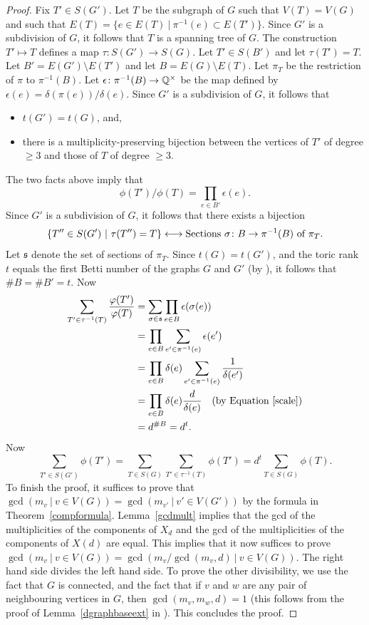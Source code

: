 \begin{proof}
 Fix $T' \in S(G')$. Let $T$ be the subgraph of $G$ such that $V(T) = V(G)$ and such that $E(T) = \{ e \in E(T) \ | \ \pi^{-1}(e) \subset E(T') \}$. Since $G'$ is a subdivision of $G$, it follows that $T$ is a spanning tree of $G$. The construction $T' \mapsto T$ defines a map $\tau \colon S(G') \rightarrow S(G)$. Let $T' \in S(B')$ and let $\tau(T') = T$. Let $B' = E(G') \setminus E(T')$ and let  $B = E(G) \setminus E(T)$. Let $\pi_T$ be the restriction of $\pi$ to $\pi^{-1}(B)$. Let $\epsilon \colon \pi^{-1}(B) \rightarrow \Q^\times$ be the map defined by $\epsilon(e) = \delta(\pi(e))/\delta(e)$. Since $G'$ is a subdivision of $G$, it follows that
 \begin{itemize}
  \item $t(G') = t(G)$, and,
  \item there is a multiplicity-preserving bijection between the vertices of $T'$ of degree $\geq 3$ and those of $T$ of degree $\geq 3$.
 \end{itemize}
The two facts above imply that 
\[ \phi(T')/\phi(T) = \prod_{e \in B'} \epsilon(e) .\]
Since $G'$ is a subdivision of $G$, it follows that there exists a bijection
\[ \{ T'' \in S(G') \ | \ \tau(T'') = T \} \longleftrightarrow \textup{Sections } \sigma \colon B \rightarrow \pi^{-1}(B) \textup{ of } \pi_T .\]
Let $\mathfrak{s}$ denote the set of sections of $\pi_T$. Since $t(G) = t(G')$, and the toric rank $t$ equals the first Betti number of the graphs $G$ and $G'$ (by \cite[9.2.5,9.2.8]{blr}), it follows that $\# B = \# B' = t$. Now
\begin{align*} \sum_{T' \in \tau^{-1}(T)} \frac{\phi(T')}{\phi(T)} &= \sum_{\sigma \in \mathfrak{s}} \prod_{e \in B} \epsilon (\sigma(e)) \\
&= \prod_{e \in B} \sum_{e' \in \pi^{-1}(e)} \epsilon(e') \\
&= \prod_{e \in B} \delta(e) \sum_{e' \in \pi^{-1}(e)} \frac{1}{\delta(e')} \\
&= \prod_{e \in B} \delta(e) \frac{d}{\delta(e)} \ \ \ (\textup{by Equation~\eqref{scale}}) \\
&= d^{\# B} = d^t.
\end{align*}
Now
\[ \sum_{T' \in S(G')} \phi(T') = \sum_{T \in S(G)} \sum_{T' \in \tau^{-1}(T)} \phi(T') = d^t \sum_{T \in S(G)} \phi(T)  .\]
To finish the proof, it suffices to prove that $\gcd(m_v \ | \ v \in V(G)) = \gcd(m_{v'} \ | \ v' \in V(G'))$ by the formula in Theorem~\ref{compformula}. Lemma~\ref{gcdmult} implies that the gcd of the multiplicities of the components of $X_d$ and the gcd of the multiplicities of the components of $X(d)$ are equal. This implies that it now suffices to prove $\gcd(m_v \ | \ v \in V(G)) = \gcd(m_v/\gcd(m_v,d) \ | \ v \in V(G))$. The right hand side divides the left hand side. To prove the other divisibility, we use the fact that $G$ is connected, and the fact that if $v$ and $w$ are any pair of neighbouring vertices in $G$, then $\gcd(m_v,m_w,d) = 1$ (this follows from the proof of Lemma~\ref{dgraphbaseext} in \cite{halnic}). This concludes the proof. \qedhere
\end{proof}

